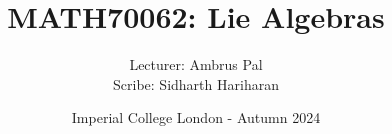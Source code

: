 \documentclass[a4paper, 12pt, openany, oneside]{book}
\title{\vspace{-2em}MATH70062: Lie Algebras}
\author{Lecturer: Ambrus Pal \\ Scribe: Sidharth Hariharan}
\date{Imperial College London - Autumn 2024}
\begin{document}
\setlength{\abovedisplayskip}{7.5pt}  %
\setlength{\belowdisplayskip}{7.5pt}  %
\setlength{\abovedisplayshortskip}{2pt}
\setlength{\belowdisplayshortskip}{2pt}

\maketitle
\thispagestyle{empty}

\tableofcontents
\thispagestyle{empty}

\newpage


% 
% 

\nocite{HorawaLiebeck}
\nocite{ErdmannWildon}
\printbibliography
\end{document}
